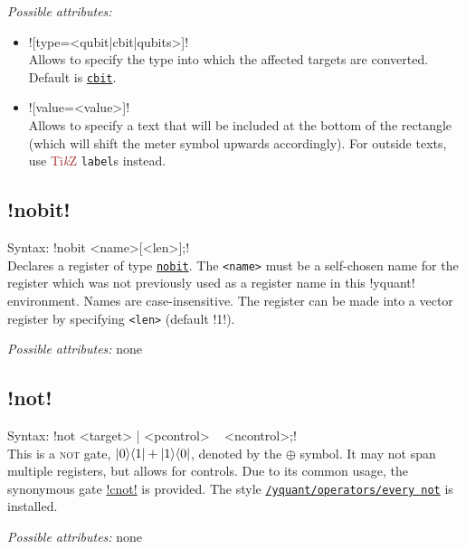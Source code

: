 \documentclass{scrartcl}
\def\TikZ{\textcolor{brown}{Ti\textit kZ}}
\def\gate#1{\hyperref[gate:#1]{\texttt{#1}}}
\def\style#1{\hyperref[style:#1]{\texttt{#1}}}
\def\ketbra#1#2{\ket{#1}\!\bra{#2}}
\begin{document}
         \emph{Possible attributes:}
         \begin{itemize}
            \item \yquant![type=<qubit|cbit|qubits>]! \\
               Allows to specify the type into which the affected targets are converted.
               Default is \gate{cbit}.
            \item \yquant![value=<value>]! \\
               Allows to specify a text that will be included at the bottom of the rectangle (which will shift the meter symbol upwards accordingly).
               For outside texts, use \TikZ{} \texttt{label}s instead.
         \end{itemize}
         
      \subsection{\texorpdfstring{\yquant!nobit!}{nobit}}\label{gate:nobit}
         Syntax: \yquant!nobit <name>[<len>];! \\
         Declares a register of type \gate{nobit}.
         The \texttt{<name>} must be a self\hyp chosen name for the register which was not previously used as a register name in this \tex!yquant! environment.
         Names are case\hyp insensitive.
         The register can be made into a vector register by specifying \texttt{<len>} (default \tex!1!).
         
         \emph{Possible attributes:} none
      
      \subsection{\texorpdfstring{\yquant!not!}{not}}\label{gate:not}
         Syntax: \yquant!not <target> | <pcontrol> ~ <ncontrol>;! \\
         This is a \textsc{not} gate, $\ketbra01 + \ketbra10$, denoted by the $\oplus$ symbol.
         It may not span multiple registers, but allows for controls.
         Due to its common usage, the synonymous gate \hyperref[gate:cnot]{\yquant!cnot!} is provided.
         The style \style{/yquant/operators/every not} is installed.
         
         \emph{Possible attributes:} none
      
\end{document}
